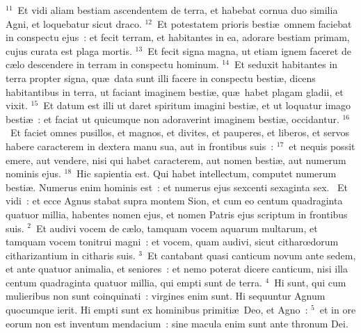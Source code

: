 ${}^{11}$~Et vidi aliam bestiam ascendentem de terra, et habebat cornua duo similia Agni, et loquebatur sicut draco.
${}^{12}$~Et potestatem prioris besti\ae\ omnem faciebat in conspectu ejus~: et fecit terram, et habitantes in ea, adorare bestiam primam, cujus curata est plaga mortis.
${}^{13}$~Et fecit signa magna, ut etiam ignem faceret de c\ae lo descendere in terram in conspectu hominum.
${}^{14}$~Et seduxit habitantes in terra propter signa, qu\ae\ data sunt illi facere in conspectu besti\ae , dicens habitantibus in terra, ut faciant imaginem besti\ae , qu\ae\ habet plagam gladii, et vixit.
${}^{15}$~Et datum est illi ut daret spiritum imagini besti\ae , et ut loquatur imago besti\ae~: et faciat ut quicumque non adoraverint imaginem besti\ae , occidantur.
${}^{16}$~Et faciet omnes pusillos, et magnos, et divites, et pauperes, et liberos, et servos habere caracterem in dextera manu sua, aut in frontibus suis~:
${}^{17}$~et nequis possit emere, aut vendere, nisi qui habet caracterem, aut nomen besti\ae , aut numerum nominis ejus.
${}^{18}$~Hic sapientia est. Qui habet intellectum, computet numerum besti\ae . Numerus enim hominis est~: et numerus ejus sexcenti sexaginta sex.
~Et vidi~: et ecce Agnus stabat supra montem Sion, et cum eo centum quadraginta quatuor millia, habentes nomen ejus, et nomen Patris ejus scriptum in frontibus suis.
${}^{2}$~Et audivi vocem de c\ae lo, tamquam vocem aquarum multarum, et tamquam vocem tonitrui magni~: et vocem, quam audivi, sicut citharœdorum citharizantium in citharis suis.
${}^{3}$~Et cantabant quasi canticum novum ante sedem, et ante quatuor animalia, et seniores~: et nemo poterat dicere canticum, nisi illa centum quadraginta quatuor millia, qui empti sunt de terra.
${}^{4}$~Hi sunt, qui cum mulieribus non sunt coinquinati~: virgines enim sunt. Hi sequuntur Agnum quocumque ierit. Hi empti sunt ex hominibus primiti\ae\ Deo, et Agno~:
${}^{5}$~et in ore eorum non est inventum mendacium~: sine macula enim sunt ante thronum Dei.


